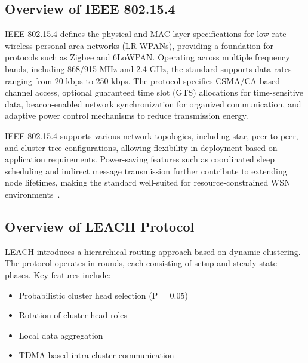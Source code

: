 \documentclass[conference]{IEEEtran}
\begin{document}
\subsection{Overview of IEEE 802.15.4}

IEEE 802.15.4 defines the physical and MAC layer specifications for low-rate wireless personal area networks (LR-WPANs), providing a foundation for protocols such as Zigbee and 6LoWPAN. Operating across multiple frequency bands, including 868/915 MHz and 2.4 GHz, the standard supports data rates ranging from 20 kbps to 250 kbps. The protocol specifies CSMA/CA-based channel access, optional guaranteed time slot (GTS) allocations for time-sensitive data, beacon-enabled network synchronization for organized communication, and adaptive power control mechanisms to reduce transmission energy.

IEEE 802.15.4 supports various network topologies, including star, peer-to-peer, and cluster-tree configurations, allowing flexibility in deployment based on application requirements. Power-saving features such as coordinated sleep scheduling and indirect message transmission further contribute to extending node lifetimes, making the standard well-suited for resource-constrained WSN environments~\cite{wsn_energy}.

\subsection{Overview of LEACH Protocol}
LEACH introduces a hierarchical routing approach based on dynamic clustering. The protocol operates in rounds, each consisting of setup and steady-state phases. Key features include:

\begin{itemize}
    \item Probabilistic cluster head selection (P = 0.05)
    \item Rotation of cluster head roles
    \item Local data aggregation
    \item TDMA-based intra-cluster communication
\end{itemize}
\end{document}
